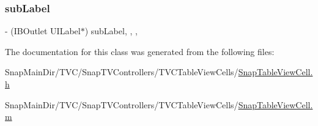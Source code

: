 \subsubsection{\texorpdfstring{sub\+Label}{subLabel}}
{\footnotesize\ttfamily -\/ (I\+B\+Outlet U\+I\+Label$\ast$) sub\+Label\hspace{0.3cm}{\ttfamily [read]}, {\ttfamily [write]}, {\ttfamily [nonatomic]}, {\ttfamily [weak]}}



The documentation for this class was generated from the following files\+:\begin{DoxyCompactItemize}
\item 
Snap\+Main\+Dir/\+T\+V\+C/\+Snap\+T\+V\+Controllers/\+T\+V\+C\+Table\+View\+Cells/\hyperlink{_snap_table_view_cell_8h}{Snap\+Table\+View\+Cell.\+h}\item 
Snap\+Main\+Dir/\+T\+V\+C/\+Snap\+T\+V\+Controllers/\+T\+V\+C\+Table\+View\+Cells/\hyperlink{_snap_table_view_cell_8m}{Snap\+Table\+View\+Cell.\+m}\end{DoxyCompactItemize}
